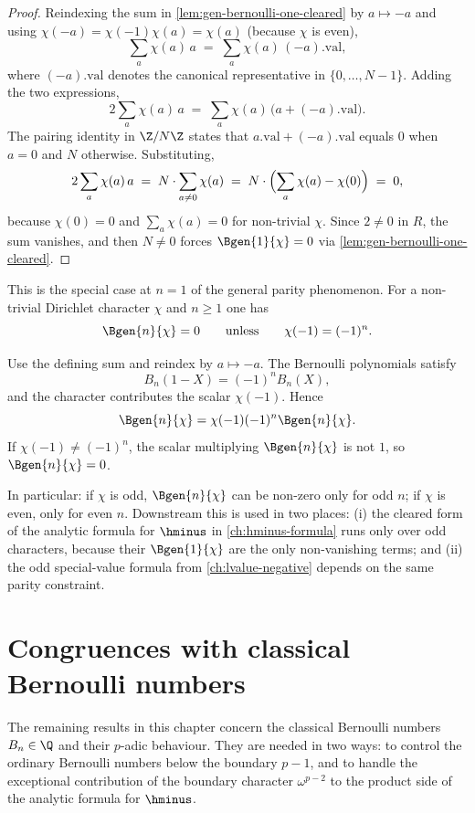 \begin{proof}\leanok
Reindexing the sum in
\cref{lem:gen-bernoulli-one-cleared} by $a \mapsto -a$ and using
$\chi(-a) = \chi(-1) \chi(a) = \chi(a)$ (because $\chi$ is even),
\[
  \sum_a \chi(a)\,a \;=\; \sum_a \chi(a)\,(-a).\text{val},
\]
where $(-a).\text{val}$ denotes the canonical representative in
$\{0,\dots,N-1\}$. Adding the two expressions,
\[
  2 \sum_a \chi(a)\,a
  \;=\; \sum_a \chi(a)\,\bigl(a + (-a).\text{val}\bigr).
\]
The pairing identity in $\Z/N\Z$ states that
$a.\text{val} + (-a).\text{val}$ equals $0$ when $a = 0$ and $N$
otherwise. Substituting,
\[
  2 \sum_a \chi(a)\,a
  \;=\; N \cdot \sum_{a \ne 0} \chi(a)
  \;=\; N \cdot \Bigl(\sum_a \chi(a) - \chi(0)\Bigr)
  \;=\; 0,
\]
because $\chi(0) = 0$ and $\sum_a \chi(a) = 0$ for non-trivial $\chi$.
Since $2 \ne 0$ in $R$, the sum vanishes, and then $N \ne 0$ forces
$\Bgen{1}{\chi} = 0$ via \cref{lem:gen-bernoulli-one-cleared}.
\end{proof}

This is the special case at $n = 1$ of the general parity phenomenon.  For a
non-trivial Dirichlet character $\chi$ and $n \ge 1$ one has
\[
  \Bgen{n}{\chi} = 0
  \qquad\text{unless}\qquad
  \chi(-1) = (-1)^n.
\]

Use the defining sum and reindex by $a\mapsto -a$.  The Bernoulli
polynomials satisfy
\[
  B_n(1-X)=(-1)^n B_n(X),
\]
and the character contributes the scalar $\chi(-1)$. Hence
\[
  \Bgen{n}{\chi}=\chi(-1)(-1)^n\Bgen{n}{\chi}.
\]
If
\(\chi(-1)\ne (-1)^n\), the scalar multiplying \(\Bgen{n}{\chi}\) is not
$1$, so \(\Bgen{n}{\chi}=0\).

In particular: if $\chi$ is odd, $\Bgen{n}{\chi}$ can be non-zero only
for odd $n$; if $\chi$ is even, only for even $n$. Downstream this is
used in two places: (i) the cleared form of the analytic formula for
$\hminus$ in \cref{ch:hminus-formula} runs only over odd characters,
because their $\Bgen{1}{\chi}$ are the only non-vanishing terms; and
(ii) the odd special-value formula from \cref{ch:lvalue-negative}
depends on the same parity constraint.

\section{Congruences with classical Bernoulli numbers}

The remaining results in this chapter concern the classical Bernoulli
numbers $B_n \in \Q$ and their $p$-adic behaviour. They are needed in
two ways: to control the ordinary Bernoulli numbers below the boundary
$p-1$, and to handle the exceptional contribution of the boundary
character $\omega^{p-2}$ to the product side of the analytic formula
for $\hminus$.

